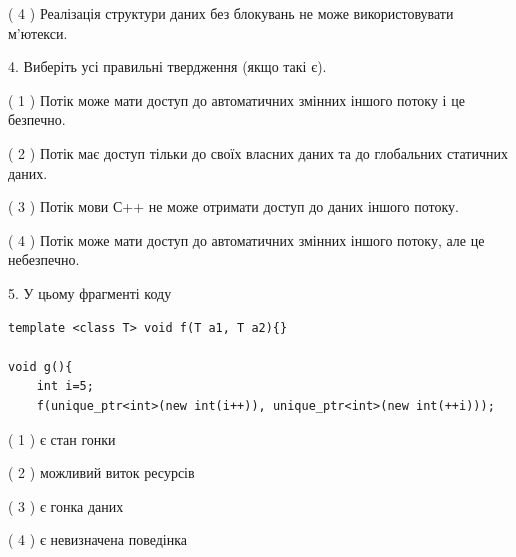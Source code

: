 \documentclass[12pt, ukrainian]{article}
\begin{document}
\begin {large}
{( 4 ) Реалізація структури даних без блокувань не може використовувати м’ютекси.%


4. Виберіть усі правильні твердження (якщо такі є).\par
\vspace{2mm}

( 1 ) Потік може мати доступ до автоматичних змінних іншого потоку і це безпечно.%

( 2 ) Потік має доступ тільки до своїх власних даних та до глобальних статичних даних.%

( 3 ) Потік мови С++ не може отримати доступ до даних іншого потоку.%

( 4 ) Потік може мати доступ до автоматичних змінних іншого потоку, але це небезпечно.%


5. У цьому фрагменті коду
\begin{verbatim}
template <class T> void f(T a1, T a2){}

void g(){
    int i=5;
    f(unique_ptr<int>(new int(i++)), unique_ptr<int>(new int(++i)));
\end{verbatim}

( 1 ) є стан гонки%

( 2 ) можливий виток ресурсів%

( 3 ) є гонка даних%

( 4 ) є невизначена поведінка%
}
\end {large}
\end{document}
